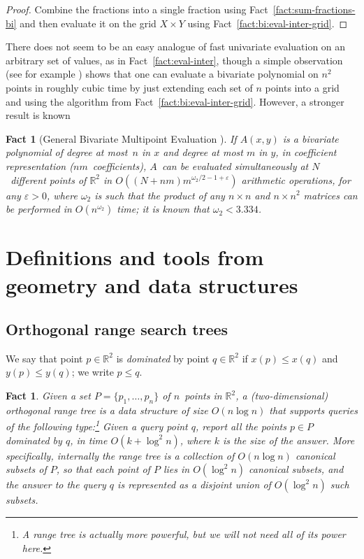 \documentclass[11pt]{article}
\newtheorem{fact}[theorem]{Fact}
\theoremstyle{remark}
\def\RR{\mathbb{R}}
\let\eps\varepsilon
\begin{document}
\begin{proof}
  Combine the fractions into a single fraction using
  Fact~\ref{fact:sum-fractions-bi} and then evaluate it on the grid
  $X\times Y$ using Fact~\ref{fact:bi:eval-inter-grid}.
\end{proof}

There does not seem to be an easy analogue of fast univariate
evaluation on an arbitrary set of values, as in
Fact~\ref{fact:eval-inter}, though a simple observation (see for
example \cite{nz-fmebp-04}) shows that one can evaluate a
bivariate polynomial on $n^2$ points in roughly cubic time by just
extending each set of $n$ points into a grid and using the algorithm
from Fact~\ref{fact:bi:eval-inter-grid}.  However, a stronger result is known




\begin{fact}[General Bivariate Multipoint Evaluation \cite{nz-fmebp-04}]
  \label{fact:bi:general-eval}
  If $A(x,y)$ is a bivariate polynomial of degree at most~$n$ in $x$
  and degree at most $m$ in $y$, in coefficient representation
  ($nm$~coefficients), $A$~can be evaluated simultaneously at
  $N$~different points of $\RR^2$ in $O((N +
  nm)m^{\omega_2/2-1+\eps})$ arithmetic operations, for any $\eps>0$,
  where $\omega_2$ is such that the product of any $n\times n$ and $n
  \times n^2$ matrices can be performed in $O(n^{\omega_2})$ time; it is
  known that $\omega_2<3.334$.
\end{fact}



\section{Definitions and tools from geometry and data structures}
\label{sec:def-ds-geom}

\subsection{Orthogonal range search trees}
\label{sec:ortho}



We say that point $p \in \RR^2$ is \emph{dominated} by point $q \in
\RR^2$ if $x(p)\leq x(q)$ and $y(p)\leq y(q)$; we write $p \leq q$.

\begin{fact}
  Given a set $P=\{p_1,\dots,p_n\}$ of $n$~points in $\RR^2$, a
  \emph{(two-dimensional) orthogonal range tree} is a data structure of size $O(n
  \log n)$ that supports queries of the following type:\footnote{A range tree is actually more powerful, but we will not need all
    of its power here.}  Given a query point $q$, report all the
  points $p\in P$ dominated by $q$, in time $O(k+\log^2 n)$, where $k$
  is the size of the answer.  More specifically, internally the range
  tree is a collection of $O(n \log n)$ \emph{canonical subsets} of $P$, so
  that each point of $P$ lies in $O(\log^2 n)$ canonical subsets, and
  the answer to the query $q$ is represented as a disjoint union of
  $O(\log^2 n)$ such subsets.
\end{fact}
\end{document}
